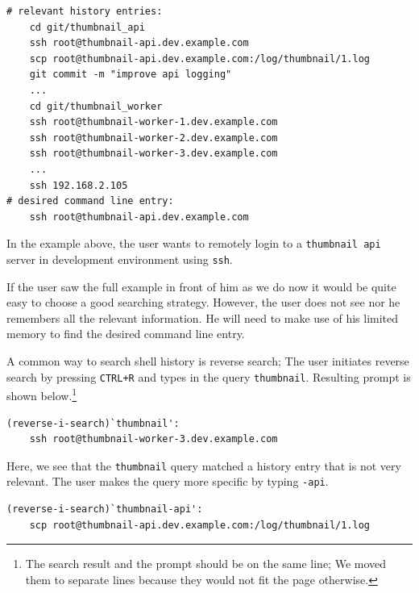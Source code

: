 \documentclass[thesis=M,english]{FITthesis}[2012/10/20]
\begin{document}

        

\begin{verbatim}
# relevant history entries:
    cd git/thumbnail_api
    ssh root@thumbnail-api.dev.example.com
    scp root@thumbnail-api.dev.example.com:/log/thumbnail/1.log
    git commit -m "improve api logging"
    ...
    cd git/thumbnail_worker
    ssh root@thumbnail-worker-1.dev.example.com
    ssh root@thumbnail-worker-2.dev.example.com
    ssh root@thumbnail-worker-3.dev.example.com
    ...
    ssh 192.168.2.105
# desired command line entry:
    ssh root@thumbnail-api.dev.example.com
\end{verbatim}

In the example above, the user wants to remotely login to a \verb|thumbnail api| server in development environment using \verb|ssh|. 

If the user saw the full example in front of him as we do now it would be quite easy to choose a good searching strategy. However, the user does not see nor he remembers all the relevant information. He will need to make use of his limited memory to find the desired command line entry. 

A common way to search shell history is reverse search; The user initiates reverse search by pressing \verb|CTRL+R| and types in the query \verb|thumbnail|. Resulting prompt is shown below.\footnote{The search result and the prompt should be on the same line; We moved them to separate lines because they would not fit the page otherwise.}

\begin{verbatim}
(reverse-i-search)`thumbnail': 
    ssh root@thumbnail-worker-3.dev.example.com
\end{verbatim}

Here, we see that the \verb|thumbnail| query matched a history entry that is not very relevant. The user makes the query more specific by typing \verb|-api|.

\begin{verbatim}
(reverse-i-search)`thumbnail-api': 
    scp root@thumbnail-api.dev.example.com:/log/thumbnail/1.log
\end{verbatim}
\end{document}
